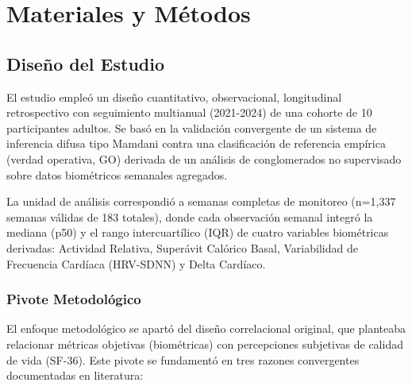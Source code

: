 \chapter{Materiales y Métodos}
\label{chap:materiales_metodos}

\section{Diseño del Estudio}
\label{sec:diseno}

El estudio empleó un diseño cuantitativo, observacional, longitudinal retrospectivo con seguimiento multianual (2021-2024) de una cohorte de 10 participantes adultos. Se basó en la validación convergente de un sistema de inferencia difusa tipo Mamdani contra una clasificación de referencia empírica (verdad operativa, GO) derivada de un análisis de conglomerados no supervisado sobre datos biométricos semanales agregados.

La unidad de análisis correspondió a semanas completas de monitoreo (n=1,337 semanas válidas de 183 totales), donde cada observación semanal integró la mediana (p50) y el rango intercuartílico (IQR) de cuatro variables biométricas derivadas: Actividad Relativa, Superávit Calórico Basal, Variabilidad de Frecuencia Cardíaca (HRV-SDNN) y Delta Cardíaco.

\subsection{Pivote Metodológico}
\label{subsec:pivote_metodologico}

El enfoque metodológico se apartó del diseño correlacional original, que planteaba relacionar métricas objetivas (biométricas) con percepciones subjetivas de calidad de vida (SF-36). Este pivote se fundamentó en tres razones convergentes documentadas en literatura:

